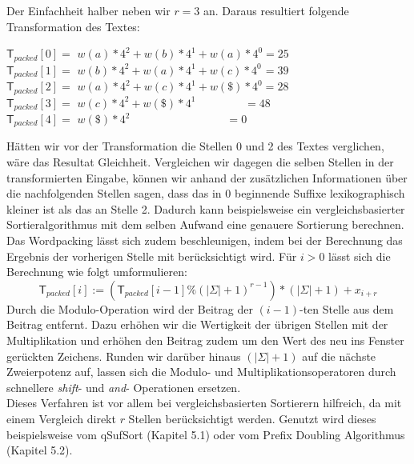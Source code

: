 Der Einfachheit halber neben wir $r=3$ an. Daraus resultiert folgende Transformation des Textes:
\begin{flushleft}
$\mathsf{T}_{packed}[0]=$ $w(a)* 4^{2}+w(b)* 4^{1}+w(a)*4^{0}=25$\\
$\mathsf{T}_{packed}[1]=$ $w(b)* 4^{2}+w(a)* 4^{1}+w(c)*4^{0}\hspace{1pt} =39$\\
$\mathsf{T}_{packed}[2]=$ $w(a)* 4^{2}+w(c)* 4^{1}+w(\$)*4^{0}=28$\\
$\mathsf{T}_{packed}[3]=$ $w(c)* 4^{2}+w(\$)*4^{1}\hspace{52pt} =48$\\
$\mathsf{T}_{packed}[4]=$ $w(\$)* 4^{2}\hspace{103pt}=0$
\end{flushleft}
Hätten wir vor der Transformation die Stellen 0 und 2 des Textes verglichen, wäre das Resultat Gleichheit. Vergleichen wir dagegen die selben Stellen in der transformierten Eingabe, können wir anhand der zusätzlichen Informationen über die nachfolgenden Stellen sagen, dass das in 0 beginnende Suffixe lexikographisch kleiner ist als das an Stelle 2. Dadurch kann beispielsweise ein vergleichsbasierter Sortieralgorithmus mit dem selben Aufwand eine genauere Sortierung berechnen.\\
Das Wordpacking lässt sich zudem beschleunigen, indem bei der Berechnung das Ergebnis der vorherigen Stelle mit berücksichtigt wird. Für $i > 0$ lässt sich die Berechnung wie folgt umformulieren:
\begin{equation}
\mathsf{T}_{packed}[i] := (\mathsf{T}_{packed}[i-1] \% (|\Sigma|+1)^{r-1})*(|\Sigma|+1) + x_{i+r}
\end{equation}
Durch die Modulo-Operation wird der Beitrag der $(i-1)$-ten Stelle aus dem Beitrag entfernt. Dazu erhöhen wir die Wertigkeit der übrigen Stellen mit der Multiplikation und erhöhen den Beitrag zudem um den Wert des neu ins Fenster gerückten Zeichens.
Runden wir darüber hinaus $(|\Sigma|+1)$ auf die nächste Zweierpotenz auf, lassen sich die Modulo- und Multiplikationsoperatoren durch schnellere \textit{shift}- und \textit{and}- Operationen ersetzen. \\
Dieses Verfahren ist vor allem bei vergleichsbasierten Sortierern hilfreich, da mit einem Vergleich direkt $r$ Stellen berücksichtigt werden. Genutzt wird dieses beispielsweise vom qSufSort (Kapitel 5.1) oder vom Prefix Doubling Algorithmus (Kapitel 5.2).
